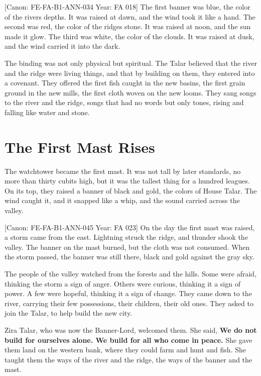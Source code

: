 {[}Canon: FE-FA-B1-ANN-034 \textbar{} Year: FA 018{]} The first banner
was blue, the color of the river\textquotesingle s depths. It was raised
at dawn, and the wind took it like a hand. The second was red, the color
of the ridge\textquotesingle s stone. It was raised at noon, and the sun
made it glow. The third was white, the color of the clouds. It was
raised at dusk, and the wind carried it into the dark.

The binding was not only physical but spiritual. The Talar believed that
the river and the ridge were living things, and that by building on
them, they entered into a covenant. They offered the first fish caught
in the new basins, the first grain ground in the new mills, the first
cloth woven on the new looms. They sang songs to the river and the
ridge, songs that had no words but only tones, rising and falling like
water and stone.

\section{The First Mast Rises}\label{the-first-mast-rises}

The watchtower became the first mast. It was not tall by later
standards, no more than thirty cubits high, but it was the tallest thing
for a hundred leagues. On its top, they raised a banner of black and
gold, the colors of House Talar. The wind caught it, and it snapped like
a whip, and the sound carried across the valley.

{[}Canon: FE-FA-B1-ANN-045 \textbar{} Year: FA 023{]} On the day the
first mast was raised, a storm came from the east. Lightning struck the
ridge, and thunder shook the valley. The banner on the mast burned, but
the cloth was not consumed. When the storm passed, the banner was still
there, black and gold against the gray sky.

The people of the valley watched from the forests and the hills. Some
were afraid, thinking the storm a sign of anger. Others were curious,
thinking it a sign of power. A few were hopeful, thinking it a sign of
change. They came down to the river, carrying their few possessions,
their children, their old ones. They asked to join the Talar, to help
build the new city.

Zira Talar, who was now the Banner-Lord, welcomed them. She said,
\textbf{We do not build for ourselves alone. We build for all who come
in peace.} She gave them land on the western bank, where they could farm
and hunt and fish. She taught them the ways of the river and the ridge,
the ways of the banner and the mast.

